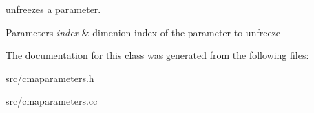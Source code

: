 unfreezes a parameter. 


\begin{DoxyParams}{Parameters}
{\em index} & dimenion index of the parameter to unfreeze \\
\hline
\end{DoxyParams}


The documentation for this class was generated from the following files\-:\begin{DoxyCompactItemize}
\item 
src/cmaparameters.\-h\item 
src/cmaparameters.\-cc\end{DoxyCompactItemize}
